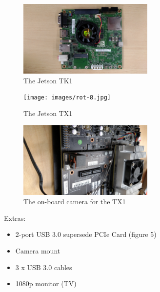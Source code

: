\documentclass[letterpaper,10pt,titlepage]{IEEEtran}
\begin{document}
\begin{figure}[!ht]
  \caption{The Jetson TK1}
	  \centering
		    \includegraphics[width=0.6\textwidth,natwidth=610,natheight=642]{images/rot-9.jpg}
				\end{figure}
\begin{figure}[!ht]
  \caption{The Jetson TX1}
	  \centering
		    \texttt{[image: images/rot-8.jpg]}
				\end{figure}
\begin{figure}[!ht]
  \caption{The on-board camera for the TX1}
	  \centering
		    \includegraphics[width=0.6\textwidth,natwidth=610,natheight=642]{images/rot-3.jpg}
				\end{figure}
	Extras: 
		\begin{itemize}
		\item 2-port USB 3.0 supersede PCIe Card (figure 5)
		\item Camera mount
		\item 3 x USB 3.0 cables
		\item 1080p monitor (TV)\\
		\end{itemize}
\end{document}
